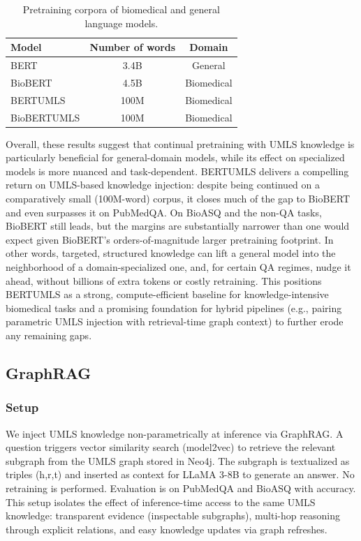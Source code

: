 \documentclass[10pt, a4paper]{article}
\begin{document}
\begin{table}[h]
\centering
\begin{tabular}{|l|c|c|}
\hline
Model & Number of words & Domain \\
\hline
BERT & 3.4B & General \\
BioBERT & 4.5B & Biomedical \\
BERTUMLS & 100M & Biomedical \\
BioBERTUMLS & 100M & Biomedical \\
\hline
\end{tabular}
\caption{Pretraining corpora of biomedical and general language models.}
\label{tab:pretraining_corpus}
\end{table}
Overall, these results suggest that continual pretraining with UMLS knowledge is particularly beneficial for general-domain models, while its effect on specialized models is more nuanced and task-dependent.
BERTUMLS delivers a compelling return on UMLS-based knowledge injection: despite being continued on a comparatively small (100M-word) corpus, it closes much of the gap to BioBERT and even surpasses it on PubMedQA. On BioASQ and the non-QA tasks, BioBERT still leads, but the margins are substantially narrower than one would expect given BioBERT’s orders-of-magnitude larger pretraining footprint. In other words, targeted, structured knowledge can lift a general model into the neighborhood of a domain-specialized one, and, for certain QA regimes, nudge it ahead, without billions of extra tokens or costly retraining. This positions BERTUMLS as a strong, compute-efficient baseline for knowledge-intensive biomedical tasks and a promising foundation for hybrid pipelines (e.g., pairing parametric UMLS injection with retrieval-time graph context) to further erode any remaining gaps.
\subsection{GraphRAG}
\subsubsection{Setup}
We inject UMLS knowledge non-parametrically at inference via GraphRAG. A question triggers vector similarity search (model2vec) to retrieve the relevant subgraph from the UMLS graph stored in Neo4j. The subgraph is textualized as triples (h,r,t) and inserted as context for LLaMA 3-8B to generate an answer. No retraining is performed. Evaluation is on PubMedQA and BioASQ with accuracy. 
This setup isolates the effect of inference-time access to the same UMLS knowledge: transparent evidence (inspectable subgraphs), multi-hop reasoning through explicit relations, and easy knowledge updates via graph refreshes.
\end{document}
